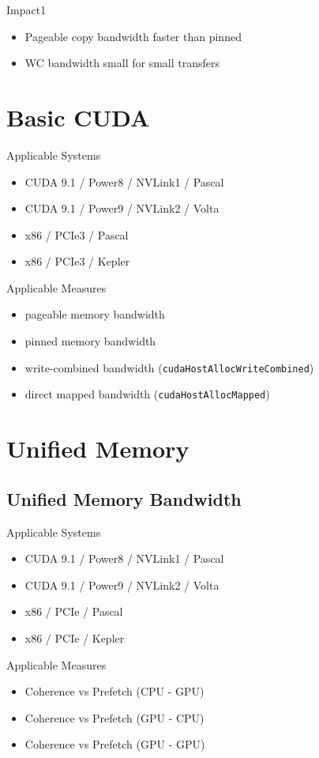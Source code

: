 Impact1
\begin{itemize}
    \item Pageable copy bandwidth faster than pinned
    \item WC bandwidth small for small transfers
\end{itemize}


\section{Basic CUDA}

Applicable Systems
\begin{itemize}
    \item CUDA 9.1 / Power8 / NVLink1 / Pascal
    \item CUDA 9.1 / Power9 / NVLink2 / Volta
    \item x86 / PCIe3 / Pascal
    \item x86 / PCIe3 / Kepler
\end{itemize}

Applicable Measures
\begin{itemize}
    \item pageable memory bandwidth
    \item pinned memory bandwidth
    \item write-combined bandwidth (\texttt{cudaHostAllocWriteCombined})
    \item direct mapped bandwidth  (\texttt{cudaHostAllocMapped})
\end{itemize}

\section{Unified Memory}



\subsection{Unified Memory Bandwidth}

Applicable Systems
\begin{itemize}
    \item CUDA 9.1 / Power8 / NVLink1 / Pascal
    \item CUDA 9.1 / Power9 / NVLink2 / Volta
    \item x86 / PCIe / Pascal
    \item x86 / PCIe / Kepler
\end{itemize}

Applicable Measures
\begin{itemize}
    \item Coherence vs Prefetch (CPU - GPU)
    \item Coherence vs Prefetch (GPU - CPU)
    \item Coherence vs Prefetch (GPU - GPU)
\end{itemize}


